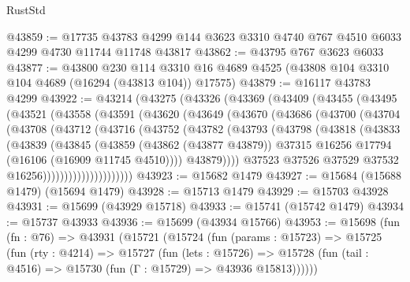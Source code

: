 \begin{lexlean}{RustStd}
\begin{coremodule}
@43859 := @17735
    @43783
    @4299
    @144
    @3623
    @3310
    @4740
    @767
    @4510
    @6033
    @4299
    @4730
    @11744
    @11748
    @43817
@43862 := @43795 @767 @3623 @6033
@43877 := @43800
    @230
    @114
    @3310
    @16
    @4689
    @4525
    (@43808 @104 @3310 @104 @4689 (@16294 (@43813 @104)) @17575)
@43879 := @16117 @43783 @4299
@43922 := @43214
    (@43275
      (@43326
        (@43369
          (@43409
            (@43455
              (@43495
                (@43521
                  (@43558
                    (@43591
                      (@43620
                        (@43649
                          (@43670
                            (@43686
                              (@43700
                                (@43704
                                  (@43708
                                    (@43712
                                      (@43716
                                        (@43752
                                          (@43782
                                            (@43793
                                              (@43798
                                                (@43818
                                                  (@43833
                                                    (@43839
                                                      (@43845
                                                        (@43859
                                                          (@43862 (@43877 @43879))
                                                          @37315
                                                          @16256
                                                          @17794
                                                          (@16106 (@16909 @11745 @4510))))
                                                      @43879))))
                                              @37523
                                              @37526
                                              @37529
                                              @37532
                                              @16256)))))))))))))))))))))
@43923 := @15682 @1479
@43927 := @15684 (@15688 @1479) (@15694 @1479)
@43928 := @15713 @1479
@43929 := @15703 @43928
@43931 := @15699 (@43929 @15718)
@43933 := @15741 (@15742 @1479)
@43934 := @15737 @43933
@43936 := @15699 (@43934 @15766)
@43953 := @15698
    (fun (fn : @76) =>
    @43931
      (@15721
        (@15724
          (fun (params : @15723) =>
          @15725
            (fun (rty : @4214) =>
            @15727
              (fun (lets : @15726) =>
              @15728 (fun (tail : @4516) => @15730 (fun (Γ : @15729) => @43936 @15813))))))

\end{coremodule}
\end{lexlean}

